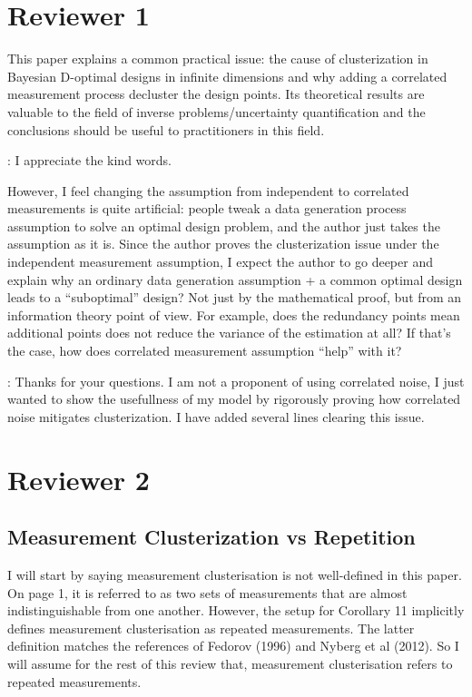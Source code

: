 \documentclass{amsart}
\begin{document}
\section{Reviewer 1}
This paper explains a common practical issue: the cause of
clusterization in Bayesian D-optimal designs in infinite dimensions
and why adding a correlated measurement process decluster the design
points. Its theoretical results are valuable to the field of inverse
problems/uncertainty quantification and the conclusions should be
useful to practitioners in this field.

\answer: I appreciate the kind words.

However, I feel changing the assumption from independent to correlated
measurements is quite artificial: people tweak a data generation
process assumption to solve an optimal design problem, and the author
just takes the assumption as it is. Since the author proves the
clusterization issue under the independent measurement assumption, I
expect the author to go deeper and explain why an ordinary data
generation assumption + a common optimal design leads to a
“suboptimal” design? Not just by the mathematical proof, but from an
information theory point of view. For example, does the redundancy
points mean additional points does not reduce the variance of the
estimation at all? If that’s the case, how does correlated measurement
assumption “help” with it?

\answer: Thanks for your questions. I am not a proponent of using
correlated noise, I just wanted to show the usefullness of my model by
rigorously proving how correlated noise mitigates clusterization. I
have added several lines clearing this issue.


\section{Reviewer 2}
\subsection{Measurement Clusterization vs Repetition}
I will start by saying measurement clusterisation is not well-defined
in this paper. On page 1, it is referred to as two sets of
measurements that are almost indistinguishable from one
another. However, the setup for Corollary 11 implicitly defines
measurement clusterisation as repeated measurements. The latter
definition matches the references of Fedorov (1996) and Nyberg et al
(2012). So I will assume for the rest of this review that, measurement
clusterisation refers to repeated measurements.
\end{document}
